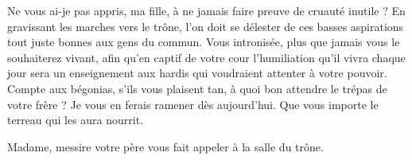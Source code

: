 \begin{drama}
  \reinespeaks Ne vous ai-je pas appris, ma fille, à ne jamais faire preuve de cruauté inutile ? En gravissant les marches vers le trône, l’on doit se délester de ces basses aspirations tout juste bonnes aux gens du commun. Vous intronisée, plus que jamais vous le souhaiterez vivant, afin qu’en captif de votre cour l’humiliation qu’il vivra chaque jour sera un enseignement aux hardis qui voudraient attenter à votre pouvoir. Compte aux bégonias, s’ils vous plaisent tan, à quoi bon attendre le trépas de votre frère ? Je vous en ferais ramener dès aujourd’hui. Que vous importe le terreau qui les aura nourrit.

  \suivanteprincessespeaks Madame, messire votre père vous fait appeler à la salle du trône.
%
%
%
\end{drama}

\scene

\StageDirII{\roi, \reine, \princesse, \elena, \alexas, \general}


